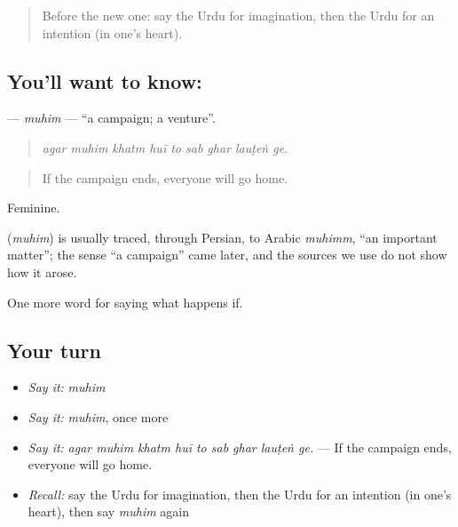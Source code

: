 \label{lesson:UR-C547-muhim}



\begin{quote}
Before the new one: say the Urdu for imagination, then the Urdu for an intention (in one's heart).
\end{quote}

\subsection*{You'll want to know: }
\textbf{} — \emph{muhim} — \textquotedblleft{}a campaign; a venture\textquotedblright{}.

\begin{quote}
        
\end{quote}

\begin{quote}
\emph{agar muhim khatm huī to sab ghar lauṭeṅ ge.}
\end{quote}

\begin{quote}
If the campaign ends, everyone will go home.
\end{quote}

Feminine.

\begin{cousinweb}
\textbf{} (\emph{muhim}) is usually traced, through Persian, to Arabic \emph{muhimm}, \textquotedblleft{}an important matter\textquotedblright{}; the sense \textquotedblleft{}a campaign\textquotedblright{} came later, and the sources we use do not show how it arose.
\end{cousinweb}

\begin{grammarlens}[title={What you've built}]
One more word for saying what happens if.
\end{grammarlens}

\subsection*{Your turn}
\begin{itemize}
\raggedright
  \item \emph{Say it:} \emph{muhim}
  \item \emph{Say it:} \emph{muhim}, once more
  \item \emph{Say it:} \emph{agar muhim khatm huī to sab ghar lauṭeṅ ge.} — If the campaign ends, everyone will go home.
  \item \emph{Recall:} say the Urdu for imagination, then the Urdu for an intention (in one's heart), then say \emph{muhim} again
\end{itemize}

